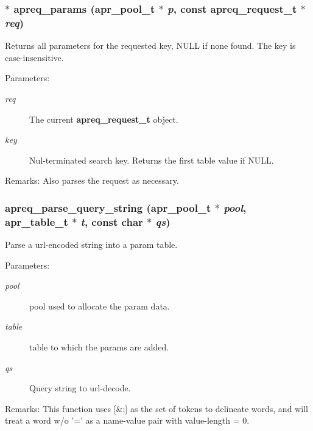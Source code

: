 \subsubsection{$\ast$ apreq\_\-params ({\bf apr\_\-pool\_\-t} $\ast$ {\em p}, const {\bf apreq\_\-request\_\-t} $\ast$ {\em req})}\label{group__params_a5}


Returns all parameters for the requested key, NULL if none found. The key is case-insensitive. \begin{Desc}
\item[Parameters:]
\begin{description}
\item[{\em req}]The current {\bf apreq\_\-request\_\-t} object. \item[{\em key}]Nul-terminated search key. Returns the first table value if NULL. \end{description}
\end{Desc}
\begin{Desc}
\item[Remarks:]Also parses the request as necessary. \end{Desc}
\subsubsection{ apreq\_\-parse\_\-query\_\-string ({\bf apr\_\-pool\_\-t} $\ast$ {\em pool}, {\bf apr\_\-table\_\-t} $\ast$ {\em t}, const char $\ast$ {\em qs})}\label{group__params_a8}


Parse a url-encoded string into a param table. \begin{Desc}
\item[Parameters:]
\begin{description}
\item[{\em pool}]pool used to allocate the param data. \item[{\em table}]table to which the params are added. \item[{\em qs}]Query string to url-decode. \end{description}
\end{Desc}
\begin{Desc}
\item[Remarks:]This function uses [\&;] as the set of tokens to delineate words, and will treat a word w/o '=' as a name-value pair with value-length = 0. \end{Desc}

